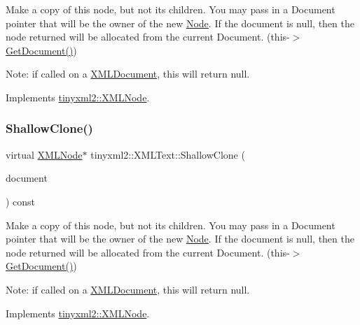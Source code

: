 Make a copy of this node, but not its children. You may pass in a Document pointer that will be the owner of the new \hyperlink{classNode}{Node}. If the \textquotesingle{}document\textquotesingle{} is null, then the node returned will be allocated from the current Document. (this-\/$>$\hyperlink{classtinyxml2_1_1XMLNode_af343d1ef0b45c0020e62d784d7e67a68}{Get\+Document()})

Note\+: if called on a \hyperlink{classtinyxml2_1_1XMLDocument}{X\+M\+L\+Document}, this will return null. 

Implements \hyperlink{classtinyxml2_1_1XMLNode_a8402cbd3129d20e9e6024bbcc0531283}{tinyxml2\+::\+X\+M\+L\+Node}.

\mbox{\label{classtinyxml2_1_1XMLText_af3a81ed4dd49d5151c477b3f265a3011}} 
\subsubsection{\texorpdfstring{Shallow\+Clone()}{ShallowClone()}\hspace{0.1cm}{\footnotesize\ttfamily [2/2]}}
{\footnotesize\ttfamily virtual \hyperlink{classtinyxml2_1_1XMLNode}{X\+M\+L\+Node}$\ast$ tinyxml2\+::\+X\+M\+L\+Text\+::\+Shallow\+Clone (\begin{DoxyParamCaption}\item[{\hyperlink{classtinyxml2_1_1XMLDocument}{X\+M\+L\+Document} $\ast$}]{document }\end{DoxyParamCaption}) const\hspace{0.3cm}{\ttfamily [virtual]}}

Make a copy of this node, but not its children. You may pass in a Document pointer that will be the owner of the new \hyperlink{classNode}{Node}. If the \textquotesingle{}document\textquotesingle{} is null, then the node returned will be allocated from the current Document. (this-\/$>$\hyperlink{classtinyxml2_1_1XMLNode_af343d1ef0b45c0020e62d784d7e67a68}{Get\+Document()})

Note\+: if called on a \hyperlink{classtinyxml2_1_1XMLDocument}{X\+M\+L\+Document}, this will return null. 

Implements \hyperlink{classtinyxml2_1_1XMLNode_a8402cbd3129d20e9e6024bbcc0531283}{tinyxml2\+::\+X\+M\+L\+Node}.

